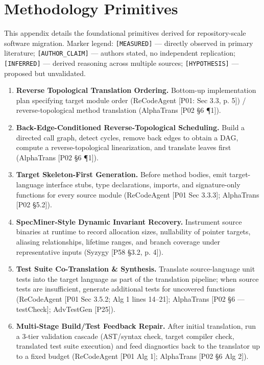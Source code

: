 \section{Methodology Primitives}
\label{app:primitives}

This appendix details the foundational primitives derived for repository-scale software migration. Marker legend: \texttt{[MEASURED]} --- directly observed in primary literature; \texttt{[AUTHOR\_CLAIM]} --- authors stated, no independent replication; \texttt{[INFERRED]} --- derived reasoning across multiple sources; \texttt{[HYPOTHESIS]} --- proposed but unvalidated.

\begin{enumerate}

\item \textbf{Reverse Topological Translation Ordering.}
Bottom-up implementation plan specifying target module order (ReCodeAgent [P01: Sec 3.3, p. 5]) / reverse-topological method translation (AlphaTrans [P02 \S6 \P1]).

\item \textbf{Back-Edge-Conditioned Reverse-Topological Scheduling.}
Build a directed call graph, detect cycles, remove back edges to obtain a DAG, compute a reverse-topological linearization, and translate leaves first (AlphaTrans [P02 \S6 \P1]).

\item \textbf{Target Skeleton-First Generation.}
Before method bodies, emit target-language interface stubs, type declarations, imports, and signature-only functions for every source module (ReCodeAgent [P01 Sec 3.3.3]; AlphaTrans [P02 \S5.2]).

\item \textbf{SpecMiner-Style Dynamic Invariant Recovery.}
Instrument source binaries at runtime to record allocation sizes, nullability of pointer targets, aliasing relationships, lifetime ranges, and branch coverage under representative inputs (Syzygy [P58 \S3.2, p. 4]).

\item \textbf{Test Suite Co-Translation \& Synthesis.}
Translate source-language unit tests into the target language as part of the translation pipeline; when source tests are insufficient, generate additional tests for uncovered functions (ReCodeAgent [P01 Sec 3.5.2; Alg 1 lines 14--21]; AlphaTrans [P02 \S6 --- testCheck]; AdvTestGen [P25]).

\item \textbf{Multi-Stage Build/Test Feedback Repair.}
After initial translation, run a 3-tier validation cascade (AST/syntax check, target compiler check, translated test suite execution) and feed diagnostics back to the translator up to a fixed budget (ReCodeAgent [P01 Alg 1]; AlphaTrans [P02 \S6 Alg 2]).


\end{enumerate}
